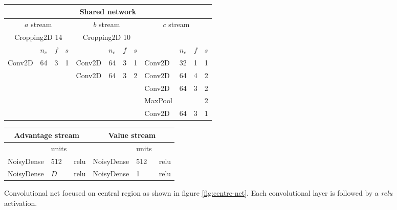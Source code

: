 
\begin{figure}
  \centering
	\begin{tabular}{l l l l | l l l l | l l l l}
		\multicolumn{12}{c}{Shared network} \\
		\midrule
		\multicolumn{4}{c|}{$a$ stream} & \multicolumn{4}{c|}{$b$ stream} & \multicolumn{4}{c}{$c$ stream} \\
		\midrule
		\multicolumn{4}{c|}{Cropping2D  14} & \multicolumn{4}{c|}{Cropping2D  10} & \multicolumn{4}{c}{} \\
		\midrule
		& $n_c$ & $f$ & $s$ & & $n_c$ & $f$ & $s$ & & $n_c$ & $f$ & $s$ \\
		\midrule
		Conv2D & 64 & 3 & 1 & Conv2D & 64 & 3 & 1 &  Conv2D & 32 & 1 & 1 \\
		 &  &  &  &           Conv2D & 64 & 3 & 2 &  Conv2D & 64 & 4 & 2 \\
		 &  &  &  &                  &    &   &   &  Conv2D & 64 & 3 & 2 \\
		 &  &  &  &                  &    &   &   & MaxPool &    &   & 2 \\
		 &  &  &  &                  &    &   &   &  Conv2D & 64 & 3 & 1 \\
		\toprule
	\end{tabular}
	\begin{tabular}{l l l | l l l}
		\multicolumn{3}{c|}{Advantage stream} & \multicolumn{3}{c}{Value stream} \\
		\toprule
		& units & & & units & \\
		\midrule
		NoisyDense & 512 & relu & NoisyDense & 512 & relu \\
		NoisyDense & $D$ & relu & NoisyDense & 1 & relu \\
		\toprule
	\end{tabular}
	\caption{Convolutional net focused on central region as shown in figure \ref{fig:centre-net}. Each convolutional layer is followed by a \emph{relu} activation.}
	\label{fig:conv-focus}
\end{figure}
